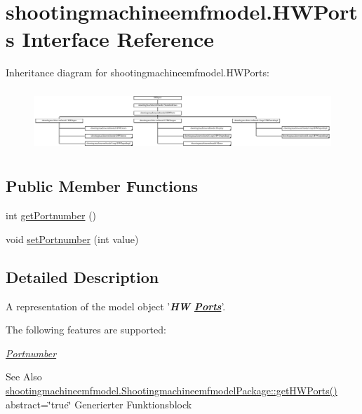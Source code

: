 \hypertarget{interfaceshootingmachineemfmodel_1_1_h_w_ports}{\section{shootingmachineemfmodel.\-H\-W\-Ports Interface Reference}
\label{interfaceshootingmachineemfmodel_1_1_h_w_ports}
}
Inheritance diagram for shootingmachineemfmodel.\-H\-W\-Ports\-:\begin{figure}[H]
\begin{center}
\leavevmode
\includegraphics[height=2.367150cm]{interfaceshootingmachineemfmodel_1_1_h_w_ports}
\end{center}
\end{figure}
\subsection*{Public Member Functions}
\begin{DoxyCompactItemize}
\item 
int \hyperlink{interfaceshootingmachineemfmodel_1_1_h_w_ports_adb85d02765e7381807dd4f9e41b14fcc}{get\-Portnumber} ()
\item 
void \hyperlink{interfaceshootingmachineemfmodel_1_1_h_w_ports_a71fe51a1b77950af04266eed1727f22e}{set\-Portnumber} (int value)
\end{DoxyCompactItemize}


\subsection{Detailed Description}
A representation of the model object '{\itshape {\bfseries H\-W \hyperlink{interfaceshootingmachineemfmodel_1_1_ports}{Ports}}}'.

The following features are supported\-: 
\begin{DoxyItemize}
\item \hyperlink{interfaceshootingmachineemfmodel_1_1_h_w_ports_adb85d02765e7381807dd4f9e41b14fcc}{{\itshape Portnumber}} 
\end{DoxyItemize}

\begin{DoxySeeAlso}{See Also}
\hyperlink{interfaceshootingmachineemfmodel_1_1_shootingmachineemfmodel_package_a61f991dc891f5f2bb2bed180315251ca}{shootingmachineemfmodel.\-Shootingmachineemfmodel\-Package\-::get\-H\-W\-Ports()}  abstract=\char`\"{}true\char`\"{} Generierter Funktionsblock 
\end{DoxySeeAlso}


